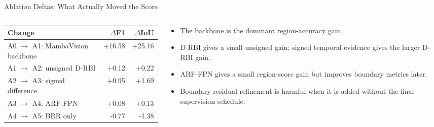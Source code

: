 \begin{frame}{Ablation Deltas: What Actually Moved the Score}
    \begin{columns}[T,onlytextwidth]
        \begin{column}{0.53\textwidth}
            \centering
            \scriptsize
            \begin{tabular}{lrr}
                \toprule
                \textbf{Change} & \(\Delta\)\textbf{F1} & \(\Delta\)\textbf{IoU} \\
                \midrule
                A0 \(\rightarrow\) A1: MambaVision backbone & +16.58 & +25.16 \\
                A1 \(\rightarrow\) A2: unsigned D-RBI & +0.12 & +0.22 \\
                A2 \(\rightarrow\) A3: signed difference & +0.95 & +1.69 \\
                A3 \(\rightarrow\) A4: ARF-FPN & +0.08 & +0.13 \\
                A4 \(\rightarrow\) A5: BRR only & -0.77 & -1.38 \\
                \bottomrule
            \end{tabular}
        \end{column}
        \begin{column}{0.44\textwidth}
            \small
            \begin{itemize}
                \item The backbone is the dominant region-accuracy gain.
                \item D-RBI gives a small unsigned gain; signed temporal evidence gives the larger D-RBI gain.
                \item ARF-FPN gives a small region-score gain but improves boundary metrics later.
                \item Boundary residual refinement is harmful when it is added without the final supervision schedule.
            \end{itemize}
        \end{column}
    \end{columns}
\end{frame}

